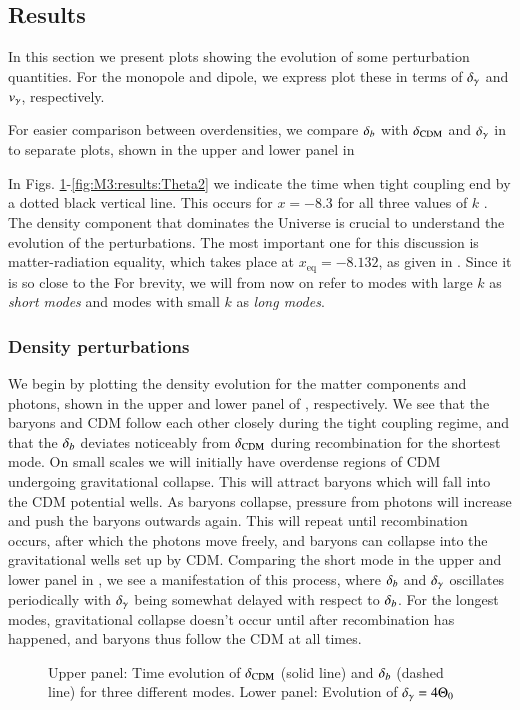 \subsection{Results}\label{ssec:M3:results}

In this section we present plots showing the evolution of some perturbation quantities. For the monopole and dipole, we express plot these in terms of $\delta_\gamma$ and $v_\gamma$, respectively. 

For easier comparison between overdensities, we compare $\delta_b$ with $\delta_\mathrm{CDM}$ and $\delta_\gamma$ in to separate plots, shown in the upper and lower panel in  

In Figs. \ref{fig:M3:results:deltas}-\ref{fig:M3:results:Theta2} we indicate the time when tight coupling end by a dotted black vertical line. This occurs for $x=-8.3$ for all three values of $k$ . The density component that dominates the Universe is crucial to understand the evolution of the perturbations. The most important one for this discussion is matter-radiation equality, which takes place at $x_\mathrm{eq}=-8.132$, as given in . Since it is so close to the 
 For brevity, we will from now on refer to modes with large $k$ as \textit{short modes} and modes with small $k$ as \textit{long modes}.     

\subsubsection{Density perturbations} \label{sssec:M3:results:density_perturbations}
We begin by plotting the density evolution for the matter components and photons, shown in the upper and lower panel of , respectively. We see that the baryons and CDM follow each other closely during the tight coupling regime, and that the $\delta_b$ deviates noticeably from $\delta_\mathrm{CDM}$ during recombination for the shortest mode. On small scales we will initially have overdense regions of CDM undergoing gravitational collapse. This will attract baryons which will fall into the CDM potential wells. As baryons collapse, pressure from photons will increase and push the baryons outwards again. This will repeat until recombination occurs, after which the photons move freely, and baryons can collapse into the gravitational wells set up by CDM. Comparing the short mode in the upper and lower panel in , we see a manifestation of this process, where $\delta_b$ and $\delta_\gamma$ oscillates periodically with $\delta_\gamma$ being somewhat delayed with respect to $\delta_b$. For the longest modes, gravitational collapse doesn't occur until after recombination has happened, and baryons thus follow the CDM at all times.  
\begin{figure}[ht!]
    \caption{Upper panel: Time evolution of $\delta_\mathrm{CDM}$ (solid line) and $\delta_b$ (dashed line) for three different modes. Lower panel: Evolution of $\delta_\gamma=4\Theta_0$}
    \label{fig:M3:results:deltas}
\end{figure}



